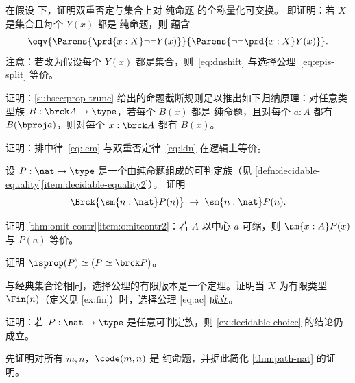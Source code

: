 \begin{ex}\label{ex:lem-impl-dn-commutes}
  在假设 \LEM{} 下，证明双重否定与集合上对 纯命题 的全称量化可交换。
  即证明：若 $X$ 是集合且每个 $Y(x)$ 都是 纯命题，则 \LEM{} 蕴含
  \begin{equation}
    \eqv{\Parens{\prd{x:X} \neg\neg Y(x)}}{\Parens{\neg\neg \prd{x:X} Y(x)}}.\label{eq:dnshift}
  \end{equation}
  注意：若改为假设每个 $Y(x)$ 都是集合，则~\eqref{eq:dnshift} 与选择公理~\eqref{eq:epis-split} 等价。
\end{ex}

\begin{ex}\label{ex:prop-trunc-ind}
  证明：\cref{subsec:prop-trunc} 给出的命题截断规则足以推出如下归纳原理：对任意类型族 $B:\brck A \to \type$，若每个 $B(x)$ 都是 纯命题，且对每个 $a:A$ 都有 $B(\bproj a)$，则对每个 $x:\brck A$ 都有 $B(x)$。
\end{ex}

\begin{ex}\label{ex:lem-ldn}
  证明：排中律~\eqref{eq:lem} 与双重否定律~\eqref{eq:ldn} 在逻辑上等价。
\end{ex}

\begin{ex}\label{ex:decidable-choice}
  设 $P:\nat\to\type$ 是一个由纯命题组成的可判定族（见 \cref{defn:decidable-equality}\ref{item:decidable-equality2}）。
  证明
  \[ \Brck{\sm{n:\nat} P(n)} \;\to\; \sm{n:\nat}P(n).\]
\end{ex}

\begin{ex}\label{ex:omit-contr2}
  证明 \cref{thm:omit-contr}\ref{item:omitcontr2}：若 $A$ 以中心 $a$ 可缩，则 $\sm{x:A} P(x)$ 与 $P(a)$ 等价。
\end{ex}

\begin{ex}\label{ex:isprop-equiv-equiv-bracket}
  证明 $\isprop(P) \simeq (P \simeq \brck P)$。
\end{ex}

\begin{ex}\label{ex:finite-choice}
  与经典集合论相同，选择公理的有限版本是一个定理。证明当 $X$ 为有限类型 $\Fin(n)$（定义见 \cref{ex:fin}）时，选择公理 \eqref{eq:ac} 成立。
\end{ex}

\begin{ex}\label{ex:decidable-choice-strong}
  证明：若 $P:\nat\to\type$ 是任意可判定族，则 \cref{ex:decidable-choice} 的结论仍成立。
\end{ex}

\begin{ex}\label{ex:n-set}
  先证明对所有 $m,n$，$\code(m,n)$ 是 纯命题，并据此简化 \cref{thm:path-nat} 的证明。
\end{ex}

